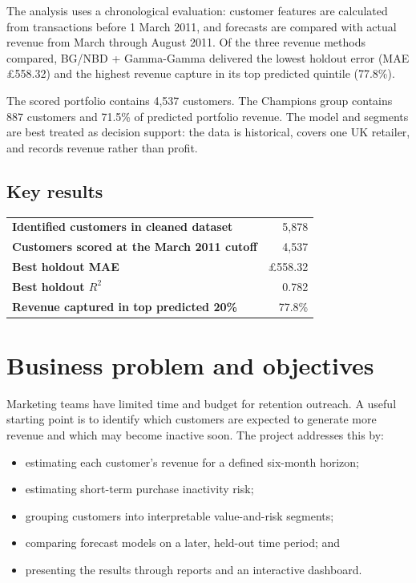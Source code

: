 \documentclass[11pt,a4paper]{article}
\newcommand{\GBP}{\pounds}
\newcommand{\metric}[2]{\textbf{#1} & #2\\}
\begin{document}
The analysis uses a chronological evaluation: customer features are calculated
from transactions before 1 March 2011, and forecasts are compared with actual
revenue from March through August 2011. Of the three revenue methods compared,
BG/NBD + Gamma-Gamma delivered the lowest holdout error (MAE \GBP 558.32) and
the highest revenue capture in its top predicted quintile (77.8\%).

The scored portfolio contains 4,537 customers. The Champions group contains
887 customers and 71.5\% of predicted portfolio revenue. The model and
segments are best treated as decision support: the data is historical, covers
one UK retailer, and records revenue rather than profit.

\subsection*{Key results}
\begin{center}
\begin{tabular}{@{}lr@{}}
\toprule
\metric{Identified customers in cleaned dataset}{5,878}
\metric{Customers scored at the March 2011 cutoff}{4,537}
\metric{Best holdout MAE}{\GBP 558.32}
\metric{Best holdout $R^2$}{0.782}
\metric{Revenue captured in top predicted 20\%}{77.8\%}
\bottomrule
\end{tabular}
\end{center}

\section{Business problem and objectives}

Marketing teams have limited time and budget for retention outreach. A useful
starting point is to identify which customers are expected to generate more
revenue and which may become inactive soon. The project addresses this by:
\begin{itemize}
  \item estimating each customer's revenue for a defined six-month horizon;
  \item estimating short-term purchase inactivity risk;
  \item grouping customers into interpretable value-and-risk segments;
  \item comparing forecast models on a later, held-out time period; and
  \item presenting the results through reports and an interactive dashboard.
\end{itemize}
\end{document}
